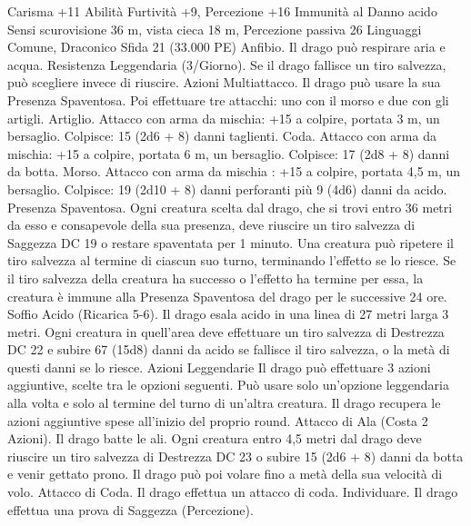 \begin{multicols}{2}
Carisma +11
Abilità Furtività +9, Percezione +16
Immunità al Danno acido
Sensi scurovisione 36 m, vista cieca 18 m, Percezione passiva 26
Linguaggi Comune, Draconico
Sfida 21 (33.000 PE)
Anfibio. Il drago può respirare aria e acqua.
Resistenza Leggendaria (3/Giorno). Se il drago fallisce un tiro
salvezza, può scegliere invece di riuscire.
Azioni
Multiattacco. Il drago può usare la sua Presenza Spaventosa. Poi
effettuare tre attacchi: uno con il morso e due con gli artigli.
Artiglio. Attacco con arma da mischia: +15 a colpire, portata 3
m, un bersaglio.
Colpisce: 15 (2d6 + 8) danni taglienti.
Coda. Attacco con arma da mischia: +15 a colpire, portata 6 m,
un bersaglio.
Colpisce: 17 (2d8 + 8) danni da botta.
Morso. Attacco con arma da mischia : +15 a colpire, portata 4,5
m, un bersaglio.
Colpisce: 19 (2d10 + 8) danni perforanti più 9 (4d6) danni da
acido.
Presenza Spaventosa. Ogni creatura scelta dal drago, che si trovi
entro 36 metri da esso e consapevole della sua presenza, deve
riuscire un tiro salvezza di Saggezza DC 19 o restare spaventata
per 1 minuto. Una creatura può ripetere il tiro salvezza al termine
di ciascun suo turno, terminando l’effetto se lo riesce. Se il tiro
salvezza della creatura ha successo o l’effetto ha termine per
essa, la creatura è immune alla Presenza Spaventosa del drago
per le successive 24 ore.
Soffio Acido (Ricarica 5-6). Il drago esala acido in una linea di
27 metri larga 3 metri. Ogni creatura in quell’area deve effettuare
un tiro salvezza di Destrezza DC 22 e subire 67 (15d8) danni da
acido se fallisce il tiro salvezza, o la metà di questi danni se lo
riesce.
Azioni Leggendarie
Il drago può effettuare 3 azioni aggiuntive, scelte tra le opzioni
seguenti. Può usare solo un’opzione leggendaria alla volta e solo
al termine del turno di un’altra creatura. Il drago recupera le
azioni aggiuntive spese all’inizio del proprio round.
Attacco di Ala (Costa 2 Azioni). Il drago batte le ali. Ogni
creatura entro 4,5 metri dal drago deve riuscire un tiro salvezza
di Destrezza DC 23 o subire 15 (2d6 + 8) danni da botta e
venir gettato prono. Il drago può poi volare fino a metà della sua
velocità di volo.
Attacco di Coda. Il drago effettua un attacco di coda.
Individuare. Il drago effettua una prova di Saggezza
(Percezione).
 

\end{multicols}
